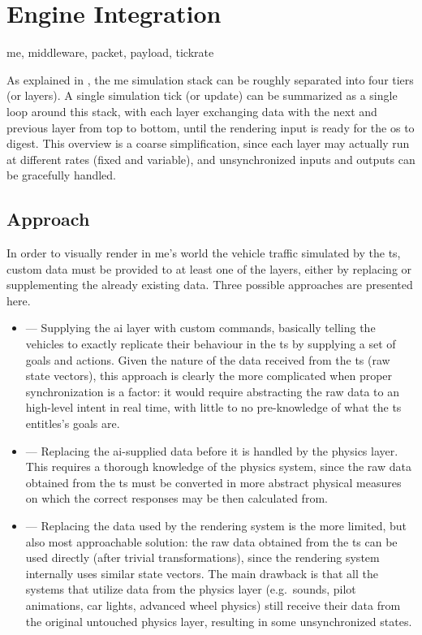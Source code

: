 \chapter{Engine Integration}\label{ch:integration}

\begin{keywords}
	me, middleware, packet, payload, tickrate
\end{keywords}

As explained in , the \gls{me} simulation stack can be roughly separated into four tiers (or layers). A single simulation tick (or update) can be summarized as a single loop around this stack, with each layer exchanging data with the next and previous layer from top to bottom, until the rendering input is ready for the \gls{os} to digest. This overview is a coarse simplification, since each layer may actually run at different rates (fixed and variable), and unsynchronized inputs and outputs can be gracefully handled.

\section{Approach}\label{sc:integration:approach}

In order to visually render in \gls{me}'s world the vehicle traffic simulated by the \gls{ts}, custom data must be provided to at least one of the layers, either by replacing or supplementing the already existing data. Three possible approaches are presented here.

\begin{itemize}
	\item {} --- Supplying the \gls{ai} layer with custom commands, basically telling the vehicles to exactly replicate their behaviour in the \gls{ts} by supplying a set of goals and actions. Given the nature of the data received from the \gls{ts} (raw state vectors), this approach is clearly the more complicated when proper synchronization is a factor: it would require abstracting the raw data to an high-level intent in real time, with little to no pre-knowledge of what the \gls{ts} entitles's goals are.
	\item {} --- Replacing the \gls{ai}-supplied data before it is handled by the physics layer. This requires a thorough knowledge of the physics system, since the raw data obtained from the \gls{ts} must be converted in more abstract physical measures on which the correct responses may be then calculated from.
	\item {} --- Replacing the data used by the rendering system is the more limited, but also most approachable solution: the raw data obtained from the \gls{ts} can be used directly (after trivial transformations), since the rendering system internally uses similar state vectors. The main drawback is that all the systems that utilize data from the physics layer (e.g.\ sounds, pilot animations, car lights, advanced wheel physics) still receive their data from the original untouched physics layer, resulting in some unsynchronized states.
\end{itemize}

